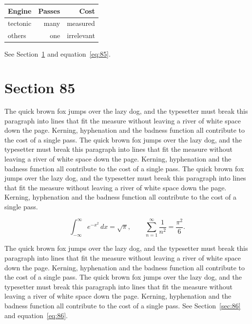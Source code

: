 \documentclass{article}
\begin{document}
\begin{center}
\begin{tabular}{lrr}
\toprule
Engine & Passes & Cost \\
\midrule
tectonic & many & measured \\
others & one & irrelevant \\
\bottomrule
\end{tabular}
\end{center}

See Section~\ref{sec:85} and equation~\eqref{eq:85}.
\section{Section 85}
\label{sec:85}
The quick brown fox jumps over the lazy dog, and the typesetter must break this paragraph into lines that fit the measure without leaving a river of white space down the page. Kerning, hyphenation and the badness function all contribute to the cost of a single pass. The quick brown fox jumps over the lazy dog, and the typesetter must break this paragraph into lines that fit the measure without leaving a river of white space down the page. Kerning, hyphenation and the badness function all contribute to the cost of a single pass. The quick brown fox jumps over the lazy dog, and the typesetter must break this paragraph into lines that fit the measure without leaving a river of white space down the page. Kerning, hyphenation and the badness function all contribute to the cost of a single pass. 

\begin{equation}\label{eq:85}
\int_{-\infty}^{\infty} e^{-x^{2}}\,dx = \sqrt{\pi}, \qquad
\sum_{n=1}^{\infty} \frac{1}{n^{2}} = \frac{\pi^{2}}{6}.
\end{equation}

The quick brown fox jumps over the lazy dog, and the typesetter must break this paragraph into lines that fit the measure without leaving a river of white space down the page. Kerning, hyphenation and the badness function all contribute to the cost of a single pass. The quick brown fox jumps over the lazy dog, and the typesetter must break this paragraph into lines that fit the measure without leaving a river of white space down the page. Kerning, hyphenation and the badness function all contribute to the cost of a single pass. 
See Section~\ref{sec:86} and equation~\eqref{eq:86}.
\end{document}
